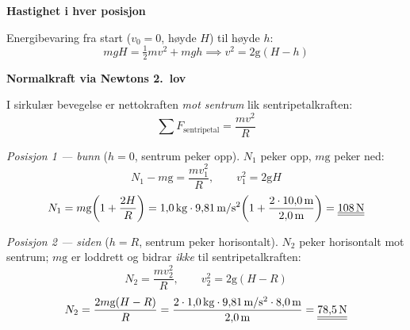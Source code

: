 {\begin{center}
\end{center}

\noindent\textbf{Hastighet i hver posisjon}

Energibevaring fra start ($v_0 = 0$, høyde $H$) til høyde $h$:
\[
  mgH = \tfrac{1}{2}mv^2 + mgh \implies v^2 = 2\mathrm{g}(H - h)
\]

\medskip
\noindent\textbf{Normalkraft via Newtons 2.\ lov}

I sirkulær bevegelse er nettokraften \emph{mot sentrum} lik sentripetalkraften:
\[
  \sum F_{\text{sentripetal}} = \frac{mv^2}{R}
\]

\medskip
\noindent\textit{Posisjon 1 — bunn} ($h = 0$, sentrum peker opp).
$N_1$ peker opp, $m\mathrm{g}$ peker ned:
\[
  N_1 - m\mathrm{g} = \frac{mv_1^2}{R}, \qquad v_1^2 = 2\mathrm{g}H
\]
\[
  N_1 = m\mathrm{g}\!\left(1 + \frac{2H}{R}\right)
      = 1{,}0\,\text{kg}\cdot9{,}81\,\text{m/s\ensuremath{^2}}
        \!\left(1 + \frac{2\cdot10{,}0\,\text{m}}{2{,}0\,\text{m}}\right)
      = \underline{\underline{108\,\text{N}}}
\]

\medskip
\noindent\textit{Posisjon 2 — siden} ($h = R$, sentrum peker horisontalt).
$N_2$ peker horisontalt mot sentrum; $m\mathrm{g}$ er loddrett og bidrar
\emph{ikke} til sentripetalkraften:
\[
  N_2 = \frac{mv_2^2}{R}, \qquad v_2^2 = 2\mathrm{g}(H - R)
\]
\[
  N_2 = \frac{2m\mathrm{g}(H - R)}{R}
      = \frac{2\cdot1{,}0\,\text{kg}\cdot9{,}81\,\text{m/s\ensuremath{^2}}
              \cdot8{,}0\,\text{m}}{2{,}0\,\text{m}}
      = \underline{\underline{78{,}5\,\text{N}}}
\]

}

